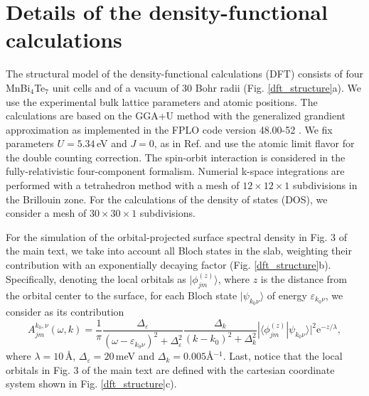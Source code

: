 \documentclass[showpacs, preprintnumbers, pra, superscriptaddress, floatfix, onecolumn, longbibliography]{revtex4-1}
\begin{document}
\title{}


\maketitle

\section{Details of the density-functional calculations}

The structural model of the density-functional calculations (DFT) consists of four MnBi$_4$Te$_7$ unit cells and of a vacuum of 30 Bohr radii (Fig. \ref{dft_structure}a). We use the experimental bulk lattice parameters and atomic positions.
The calculations are based on the GGA+U method with the generalized grandient approximation \cite{perdew1996generalized} as implemented in the FPLO code version 48.00-52 \cite{PhysRevB.59.1743}. We fix parameters $U=5.34\,$eV and $J=0$, as in Ref. \cite{otrokov2019prediction} and use the atomic limit flavor for the double counting correction. The spin-orbit interaction is considered in the fully-relativistic four-component formalism. Numerial k-space integrations are performed with a tetrahedron method with a mesh of $12\times12\times1$ subdivisions in the Brillouin zone. For the calculations of the density of states (DOS), we consider a mesh of $30\times30\times1$ subdivisions.

For the simulation of the orbital-projected surface spectral density in Fig. 3 of the main text, we take into account all Bloch states in the slab, weighting their contribution with an exponentially decaying factor (Fig. \ref{dft_structure}b). Specifically, denoting the local orbitals as $|\phi^{(z)}_{jm}\rangle$, where $z$ is the distance from the orbital center to the surface, for each Bloch state $|\psi_{k_0\nu}\rangle$ of energy $\varepsilon_{k_0\nu}$, we consider as its contribution 
\begin{equation}
A^{k_0,\nu}_{jm}(\omega,k)=\frac{1}{\pi}\frac{ \Delta_\varepsilon}{(\omega-\varepsilon_{k_0\nu})^2 + \Delta^2_\varepsilon}\frac{ \Delta_k}{(k-k_0)^2 + \Delta^2_k }|\langle \phi^{(z)}_{jm} | \psi_{k_0\nu} \rangle|^2 \text{e}^{-z/\lambda},
\end{equation}
where $\lambda=10\,$\AA, $\Delta_\varepsilon=20\,$meV and $\Delta_k=0.005$\AA$^{-1}$. Last, notice that the local orbitals in Fig. 3 of the main text are defined with the cartesian coordinate system shown in Fig. \ref{dft_structure}c).
\end{document}
